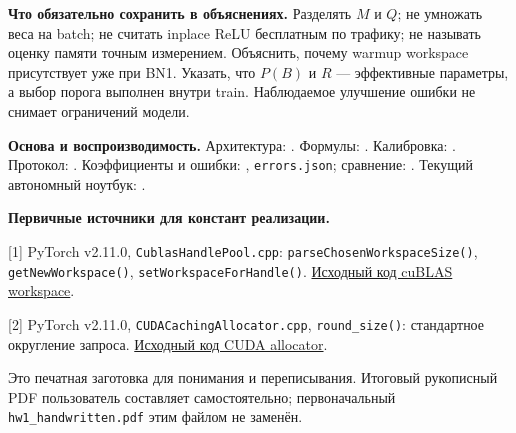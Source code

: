 \documentclass[11pt,a4paper]{article}
\begin{document}
\textbf{Что обязательно сохранить в объяснениях.}
Разделять $M$ и $Q$; не умножать веса на batch; не считать inplace ReLU
бесплатным по трафику; не называть оценку памяти точным измерением.
Объяснить, почему warmup workspace присутствует уже при BN1. Указать,
что $P(B)$ и $R$ --- эффективные параметры, а выбор порога выполнен внутри
train. Наблюдаемое улучшение ошибки не снимает ограничений модели.

\begingroup\raggedright
\textbf{Основа и воспроизводимость.}
Архитектура: . Формулы: .
Калибровка: . Протокол: .
Коэффициенты и ошибки: ,
\texttt{errors.json}; сравнение: .
Текущий автономный ноутбук: .

\par\endgroup
\textbf{Первичные источники для констант реализации.}

[1] PyTorch v2.11.0, \texttt{CublasHandlePool.cpp}:
\texttt{parseChosenWorkspaceSize()}, \texttt{getNewWorkspace()},
\texttt{setWorkspaceForHandle()}.
\href{https://github.com/pytorch/pytorch/blob/v2.11.0/aten/src/ATen/cuda/CublasHandlePool.cpp}{Исходный код cuBLAS workspace}.

[2] PyTorch v2.11.0, \texttt{CUDACachingAllocator.cpp},
\texttt{round\_size()}: стандартное округление запроса.
\href{https://github.com/pytorch/pytorch/blob/v2.11.0/c10/cuda/CUDACachingAllocator.cpp}{Исходный код CUDA allocator}.

Это печатная заготовка для понимания и переписывания. Итоговый рукописный
PDF пользователь составляет самостоятельно; первоначальный
\texttt{hw1\_handwritten.pdf} этим файлом не заменён.
\end{document}
